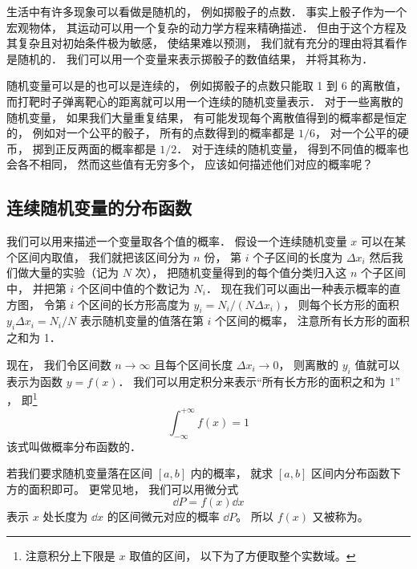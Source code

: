 

生活中有许多现象可以看做是随机的， 例如掷骰子的点数． 事实上骰子作为一个宏观物体， 其运动可以用一个复杂的动力学方程来精确描述． 但由于这个方程及其复杂且对初始条件极为敏感， 使结果难以预测， 我们就有充分的理由将其看作是随机的． 我们可以用一个变量来表示掷骰子的数值结果， 并将其称为．

随机变量可以是的也可以是连续的， 例如掷骰子的点数只能取 1 到 6 的离散值， 而打靶时子弹离靶心的距离就可以用一个连续的随机变量表示． 对于一些离散的随机变量， 如果我们大量重复结果， 有可能发现每个离散值得到的概率都是恒定的， 例如对一个公平的骰子， 所有的点数得到的概率都是 $1/6$， 对一个公平的硬币， 掷到正反两面的概率都是 $1/2$． 对于连续的随机变量， 得到不同值的概率也会各不相同， 然而这些值有无穷多个， 应该如何描述他们对应的概率呢？

\subsection{连续随机变量的分布函数}
我们可以用来描述一个变量取各个值的概率． 假设一个连续随机变量 $x$ 可以在某个区间内取值， 我们就把该区间分为 $n$ 份， 第 $i$ 个子区间的长度为 $\Delta x_i$ 然后我们做大量的实验（记为 $N$ 次）， 把随机变量得到的每个值分类归入这 $n$ 个子区间中， 并把第 $i$ 个区间中值的个数记为 $N_i$． 现在我们可以画出一种表示概率的直方图， 令第 $i$ 个区间的长方形高度为 $y_i = N_i/(N \Delta x_i)$， 则每个长方形的面积 $y_i \Delta x_i = N_i/N$ 表示随机变量的值落在第 $i$ 个区间的概率， 注意所有长方形的面积之和为 1．


现在， 我们令区间数 $n\to \infty$ 且每个区间长度 $\Delta x_i \to 0$， 则离散的 $y_i$ 值就可以表示为函数 $y = f(x)$． 我们可以用定积分来表示“所有长方形的面积之和为 1” ， 即\footnote{注意积分上下限是 $x$ 取值的区间， 以下为了方便取整个实数域。}
\begin{equation}
\int_{-\infty}^{+\infty} f(x) = 1
\end{equation}
该式叫做概率分布函数的．

若我们要求随机变量落在区间 $[a,b]$ 内的概率， 就求 $[a,b]$ 区间内分布函数下方的面积即可。 更常见地， 我们可以用微分式
\begin{equation}
\dd{P} = f(x) \dd{x}
\end{equation}
表示 $x$ 处长度为 $\dd{x}$ 的区间微元对应的概率 $\dd{P}$。 所以 $f(x)$ 又被称为。

